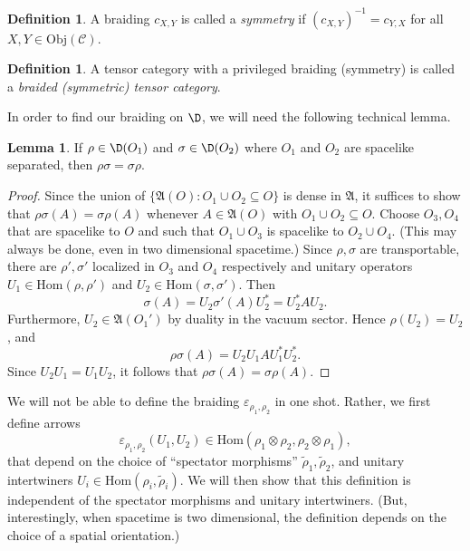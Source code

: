 \documentclass[12pt]{article}
\newcommand{\alg}[1]{\mathfrak{#1}}
\theoremstyle{definition}
\newtheorem{lemma}[thm]{Lemma}
\theoremstyle{definition}
\newtheorem{defn}[thm]{Definition}
\theoremstyle{remark}
\newcommand{\Obj}{\mathrm{Obj}}
\newcommand{\ve}{\varepsilon}
\def\wt#1{{\tilde #1}}
\def\2#1{{\mathcal #1}}
\newcommand{\Hom}{\mathrm{Hom}}
\begin{document}
\begin{defn} A braiding $c_{X,Y}$ is called a \emph{symmetry} if
  $(c_{X,Y})^{-1}=c_{Y,X}$ for all $X,Y\in \Obj (\2C )$. \end{defn}

\begin{defn} A tensor category with a privileged
  braiding (symmetry) is called a \emph{braided
    (symmetric) tensor category}. \end{defn}

In order to find our braiding on $\D$, we will need the following technical lemma.

\begin{lemma} If $\rho \in \D (O_1)$ and $\sigma \in \D (O_2)$ where $O_1$ and $O_2$
  are spacelike separated, then $\rho \sigma =\sigma \rho$.  \label{commute}
\end{lemma}

\begin{proof} Since the union of $\{ \alg{A}(O):O_1\cup
  O_2\subseteq O \}$ is dense in $\alg{A}$, it suffices
  to show that $\rho \sigma (A)=\sigma \rho (A)$
  whenever $A\in \alg{A}(O)$ with $O_1\cup O_2\subseteq
  O$.  Choose $O_3,O_4$ that are spacelike to $O$ and
  such that $O_1\cup O_3$ is spacelike to $O_2\cup
  O_4$.  (This may always be done, even in two
  dimensional spacetime.)  Since $\rho ,\sigma$ are
  transportable, there are $\rho ',\sigma '$ localized
  in $O_3$ and $O_4$ respectively and unitary operators
  $U_1\in \Hom (\rho ,\rho ')$ and $U_2\in \Hom (\sigma
  ,\sigma ')$.  Then
$$ \sigma (A)=U_2\sigma '(A)U_2^*=U_2^*AU_2 .$$
Furthermore, $U_2\in \alg{A}(O_1')$ by duality in the vacuum sector.  Hence $\rho
(U_2)=U_2$, and
$$ \rho \sigma (A)=U_2U_1AU_1^*U_2^* .$$
Since $U_2U_1=U_1U_2$, it follows that $\rho \sigma (A)=\sigma \rho (A)$.
\end{proof}

We will not be able to define the braiding $\ve _{\rho _1,\rho _2}$ in one shot.
Rather, we first define arrows
$$\ve _{\rho _1,\rho _2}(U_1,U_2)\in \Hom (\rho _1\otimes \rho _2,\rho _2\otimes \rho
_1) ,$$ that depend on the choice of ``spectator morphisms'' $\wt \rho _1,\wt \rho
_2$, and unitary intertwiners $U_i\in \Hom (\rho _i,\wt \rho _i )$.  We will then
show that this definition is independent of the spectator morphisms and unitary
intertwiners.  (But, interestingly, when spacetime is two dimensional, the definition
depends on the choice of a spatial orientation.)
\end{document}
